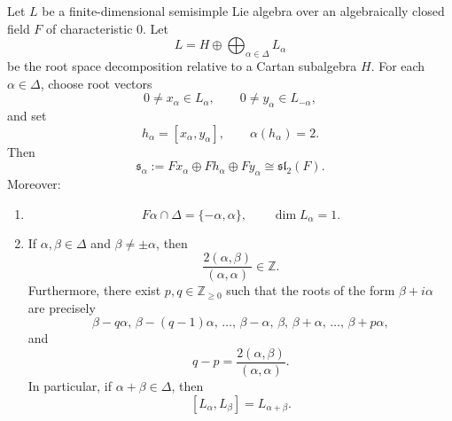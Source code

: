 
\begin{proposition}
    Let \(L\) be a finite-dimensional semisimple Lie algebra over an algebraically
    closed field \(F\) of characteristic \(0\). Let
    \[
        L=H\oplus \bigoplus_{\alpha\in\Delta} L_\alpha
    \]
    be the root space decomposition relative to a Cartan subalgebra \(H\).
    For each \(\alpha\in\Delta\), choose root vectors
    \[
        0\neq x_\alpha\in L_\alpha,\qquad
        0\neq y_\alpha\in L_{-\alpha},
    \]
    and set
    \[
        h_\alpha=[x_\alpha,y_\alpha],
        \qquad
        \alpha(h_\alpha)=2.
    \]
    Then
    \[
        \mathfrak{s}_\alpha
        :=
        F x_\alpha\oplus F h_\alpha\oplus F y_\alpha
        \cong \mathfrak{sl}_2(F).
    \]
    Moreover:
    \begin{enumerate}
        \item
              \[
                  F\alpha\cap\Delta=\{-\alpha,\alpha\},
                  \qquad
                  \dim L_\alpha=1.
              \]

        \item
              If \(\alpha,\beta\in\Delta\) and \(\beta\neq \pm\alpha\), then
              \[
                  \frac{2(\alpha,\beta)}{(\alpha,\alpha)}\in\mathbb{Z}.
              \]
              Furthermore, there exist \(p,q\in\mathbb{Z}_{\geq 0}\) such that the
              roots of the form \(\beta+i\alpha\) are precisely
              \[
                  \beta-q\alpha,\,
                  \beta-(q-1)\alpha,\,
                  \ldots,\,
                  \beta-\alpha,\,
                  \beta,\,
                  \beta+\alpha,\,
                  \ldots,\,
                  \beta+p\alpha,
              \]
              and
              \[
                  q-p
                  =
                  \frac{2(\alpha,\beta)}{(\alpha,\alpha)}.
              \]
              In particular, if \(\alpha+\beta\in\Delta\), then
              \[
                  [L_\alpha,L_\beta]=L_{\alpha+\beta}.
              \]
    \end{enumerate}
\end{proposition}

